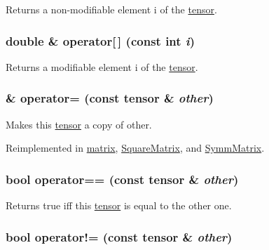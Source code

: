 Returns a non-\/modifiable element i of the \hyperlink{classJKBuilder_1_1tensor}{tensor}. \hypertarget{classJKBuilder_1_1tensor_a38c9fed6b117f7cf8b76785648d76b62}{
\subsubsection[{operator[]}]{\setlength{\rightskip}{0pt plus 5cm}double \& operator\mbox{[}$\,$\mbox{]} (const int {\em i})}}
\label{classJKBuilder_1_1tensor_a38c9fed6b117f7cf8b76785648d76b62}


Returns a modifiable element i of the \hyperlink{classJKBuilder_1_1tensor}{tensor}. \hypertarget{classJKBuilder_1_1tensor_a29113cbfe726b02b94576f631c983386}{
\subsubsection[{operator=}]{ \& operator= (const {\bf tensor} \& {\em other})}}
\label{classJKBuilder_1_1tensor_a29113cbfe726b02b94576f631c983386}


Makes this \hyperlink{classJKBuilder_1_1tensor}{tensor} a copy of other. 

Reimplemented in \hyperlink{classJKBuilder_1_1matrix_a11df53cc3fc568369a9f612cfb556680}{matrix}, \hyperlink{classJKBuilder_1_1SquareMatrix_ad78e5a12d26f1984d77a57095bc4d181}{SquareMatrix}, and \hyperlink{classJKBuilder_1_1SymmMatrix_aca4a8297278ff39c5422febf1dcbc5ac}{SymmMatrix}.\hypertarget{classJKBuilder_1_1tensor_a10ae0b61e655854d12c6465d2b9e3506}{
\subsubsection[{operator==}]{\setlength{\rightskip}{0pt plus 5cm}bool operator== (const {\bf tensor} \& {\em other})}}
\label{classJKBuilder_1_1tensor_a10ae0b61e655854d12c6465d2b9e3506}


Returns true iff this \hyperlink{classJKBuilder_1_1tensor}{tensor} is equal to the other one. \hypertarget{classJKBuilder_1_1tensor_a9b42dd835ddf2eb1a26b5d525b59b2b8}{
\subsubsection[{operator!=}]{\setlength{\rightskip}{0pt plus 5cm}bool operator!= (const {\bf tensor} \& {\em other})}}
\label{classJKBuilder_1_1tensor_a9b42dd835ddf2eb1a26b5d525b59b2b8}


